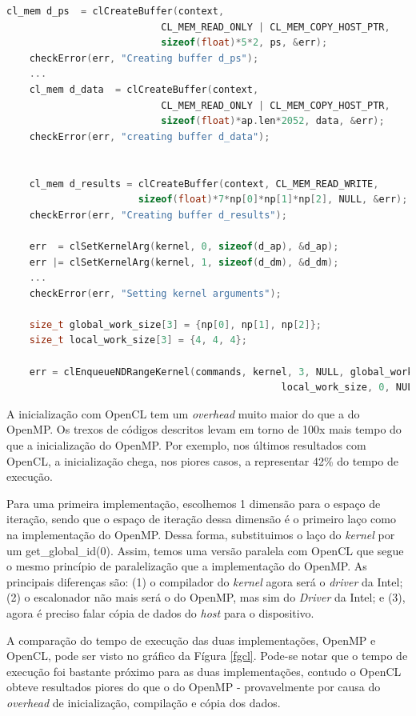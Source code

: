\documentclass[12pt]{article}
\begin{document}
\begin{lstlisting}[language=c, caption=Copiando dados para o dispositivo e colocando \textit{kernel} na fila de execução., label=initing]
    cl_mem d_ps  = clCreateBuffer(context,
                           CL_MEM_READ_ONLY | CL_MEM_COPY_HOST_PTR,
                           sizeof(float)*5*2, ps, &err);
    checkError(err, "Creating buffer d_ps");
	...
    cl_mem d_data  = clCreateBuffer(context,
                           CL_MEM_READ_ONLY | CL_MEM_COPY_HOST_PTR,
                           sizeof(float)*ap.len*2052, data, &err);
    checkError(err, "creating buffer d_data");


    cl_mem d_results = clCreateBuffer(context, CL_MEM_READ_WRITE, 
				       sizeof(float)*7*np[0]*np[1]*np[2], NULL, &err);
    checkError(err, "Creating buffer d_results");

    err  = clSetKernelArg(kernel, 0, sizeof(d_ap), &d_ap);
    err |= clSetKernelArg(kernel, 1, sizeof(d_dm), &d_dm);
	...
    checkError(err, "Setting kernel arguments"); 
    
    size_t global_work_size[3] = {np[0], np[1], np[2]};
    size_t local_work_size[3] = {4, 4, 4};

    err = clEnqueueNDRangeKernel(commands, kernel, 3, NULL, global_work_size, 
                                                local_work_size, 0, NULL, NULL);
\end{lstlisting}

A inicialização com OpenCL tem um \textit{overhead} muito maior do que a do OpenMP. Os trexos de códigos descritos levam em torno de 100x mais tempo do que a inicialização do OpenMP. Por exemplo, nos últimos resultados com OpenCL, a inicialização chega, nos piores casos, a representar 42\% do tempo de execução.

Para uma primeira implementação, escolhemos 1 dimensão para o espaço de iteração, sendo que o espaço de iteração dessa dimensão é o primeiro laço como na implementação do OpenMP. Dessa forma, substituimos o laço do \textit{kernel} por um get\_global\_id(0). Assim, temos uma versão paralela com OpenCL que segue o mesmo princípio de paralelização que a implementação do OpenMP. As principais diferenças são: (1) o compilador do \textit{kernel} agora será o \textit{driver} da Intel; (2) o escalonador não mais será o do OpenMP, mas sim do \textit{Driver} da Intel; e (3), agora é preciso falar cópia de dados do \textit{host} para o dispositivo. 

A comparação do tempo de execução das duas implementações, OpenMP e OpenCL, pode ser visto no gráfico da Fígura \ref{fgcl}. Pode-se notar que o tempo de execução foi bastante próximo para as duas implementações, contudo o OpenCL obteve resultados piores do que o do OpenMP - provavelmente por causa do \textit{overhead} de inicialização, compilação e cópia dos dados.
\end{document}
